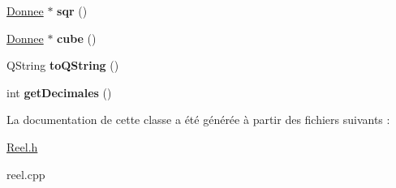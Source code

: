 \begin{DoxyCompactItemize}
\item 
\hypertarget{class_reel_a0197e1162cc2db2bbfa745f268739f41}{\hyperlink{class_donnee}{Donnee} $\ast$ {\bfseries sqr} ()}\label{class_reel_a0197e1162cc2db2bbfa745f268739f41}

\item 
\hypertarget{class_reel_aa869cd43b6e40b0b8d0b51bfbe3114de}{\hyperlink{class_donnee}{Donnee} $\ast$ {\bfseries cube} ()}\label{class_reel_aa869cd43b6e40b0b8d0b51bfbe3114de}

\item 
\hypertarget{class_reel_ad71341b4e2aaa97cecb131412abaa8cf}{Q\-String {\bfseries to\-Q\-String} ()}\label{class_reel_ad71341b4e2aaa97cecb131412abaa8cf}

\item 
\hypertarget{class_reel_aab306676b02d5001b3bebe0b2e6468c4}{int {\bfseries get\-Decimales} ()}\label{class_reel_aab306676b02d5001b3bebe0b2e6468c4}

\end{DoxyCompactItemize}


La documentation de cette classe a été générée à partir des fichiers suivants \-:\begin{DoxyCompactItemize}
\item 
\hyperlink{_reel_8h}{Reel.\-h}\item 
reel.\-cpp\end{DoxyCompactItemize}
